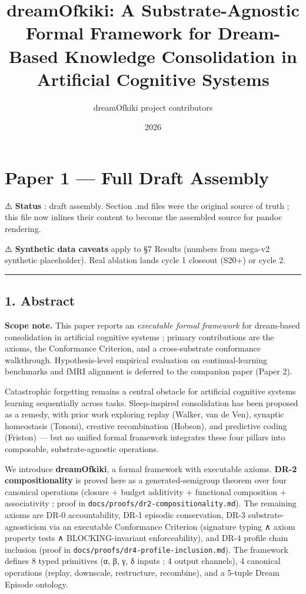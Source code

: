 \documentclass[
]{article}
\title{dreamOfkiki: A Substrate-Agnostic Formal Framework for
Dream-Based Knowledge Consolidation in Artificial Cognitive Systems}
\author{dreamOfkiki project contributors}
\date{2026}
\begin{document}
\maketitle

\section{Paper 1 --- Full Draft
Assembly}\label{paper-1-full-draft-assembly}

⚠️ \textbf{Status} : draft assembly. Section .md files were the original
source of truth ; this file now inlines their content to become the
assembled source for pandoc rendering.

⚠️ \textbf{Synthetic data caveats} apply to §7 Results (numbers from
mega-v2 synthetic placeholder). Real ablation lands cycle 1 closeout
(S20+) or cycle 2.

\begin{center}\rule{0.5\linewidth}{0.5pt}\end{center}

\subsection{1. Abstract}\label{abstract}

\textbf{Scope note.} This paper reports an \emph{executable formal
framework} for dream-based consolidation in artificial cognitive systems
; primary contributions are the axioms, the Conformance Criterion, and a
cross-substrate conformance walkthrough. Hypothesis-level empirical
evaluation on continual-learning benchmarks and fMRI alignment is
deferred to the companion paper (Paper 2).

Catastrophic forgetting remains a central obstacle for artificial
cognitive systems learning sequentially across tasks. Sleep-inspired
consolidation has been proposed as a remedy, with prior work exploring
replay (Walker, van de Ven), synaptic homeostasis (Tononi), creative
recombination (Hobson), and predictive coding (Friston) --- but no
unified formal framework integrates these four pillars into composable,
substrate-agnostic operations.

We introduce \textbf{dreamOfkiki}, a formal framework with executable
axioms. \textbf{DR-2 compositionality} is proved here as a
generated-semigroup theorem over four canonical operations (closure +
budget additivity + functional composition + associativity ; proof in
\texttt{docs/proofs/dr2-compositionality.md}). The remaining axioms are
DR-0 accountability, DR-1 episodic conservation, DR-3
substrate-agnosticism via an executable Conformance Criterion (signature
typing ∧ axiom property tests ∧ BLOCKING-invariant enforceability), and
DR-4 profile chain inclusion (proof in
\texttt{docs/proofs/dr4-profile-inclusion.md}). The framework defines 8
typed primitives (α, β, γ, δ inputs ; 4 output channels), 4 canonical
operations (replay, downscale, restructure, recombine), and a 5-tuple
Dream Episode ontology.
\end{document}
